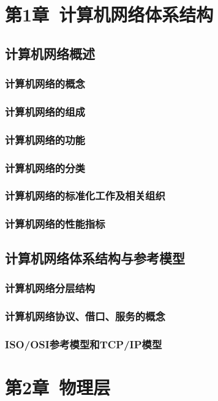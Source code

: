 \documentclass{ctexart}
\begin{document}
\tableofcontents

\section{第1章\ 计算机网络体系结构}

\subsection{计算机网络概述}
\subsubsection{计算机网络的概念}
\subsubsection{计算机网络的组成}
\subsubsection{计算机网络的功能}
\subsubsection{计算机网络的分类}
\subsubsection{计算机网络的标准化工作及相关组织}
\subsubsection{计算机网络的性能指标}

\subsection{计算机网络体系结构与参考模型}
\subsubsection{计算机网络分层结构}
\subsubsection{计算机网络协议、借口、服务的概念}
\subsubsection{ISO/OSI参考模型和TCP/IP模型}

\section{第2章\ 物理层}
\end{document}
